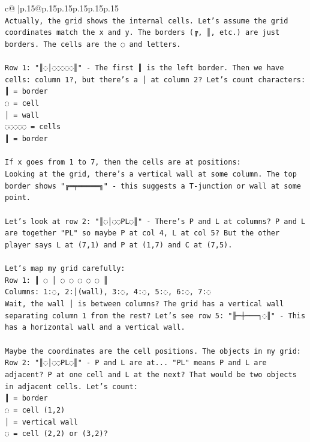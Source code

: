 \documentclass{article}
\begin{document}
{\begin{supertabular}{c@{$\;$}|p{.15\linewidth}@{}p{.15\linewidth}p{.15\linewidth}p{.15\linewidth}p{.15\linewidth}p{.15\linewidth}}
{{{\\ 
\texttt{Actually, the grid shows the internal cells. Let's assume the grid coordinates match the x and y. The borders (╔, ║, etc.) are just borders. The cells are the ◌ and letters.} \\
\\ 
\texttt{Row 1: "║◌│◌◌◌◌◌║" {-} The first ║ is the left border. Then we have cells: column 1?, but there's a │ at column 2? Let's count characters:} \\
\texttt{║ = border} \\
\texttt{◌ = cell} \\
\texttt{│ = wall} \\
\texttt{◌◌◌◌◌ = cells} \\
\texttt{║ = border} \\
\\ 
\texttt{If x goes from 1 to 7, then the cells are at positions:} \\
\texttt{Looking at the grid, there's a vertical wall at some column. The top border shows "╔═╤═════╗" {-} this suggests a T{-}junction or wall at some point.} \\
\\ 
\texttt{Let's look at row 2: "║◌│◌◌PL◌║" {-} There's P and L at columns? P and L are together "PL" so maybe P at col 4, L at col 5? But the other player says L at (7,1) and P at (1,7) and C at (7,5).} \\
\\ 
\texttt{Let's map my grid carefully:} \\
\texttt{Row 1: ║ ◌ │ ◌ ◌ ◌ ◌ ◌ ║} \\
\texttt{Columns: 1:◌, 2:│(wall), 3:◌, 4:◌, 5:◌, 6:◌, 7:◌} \\
\texttt{Wait, the wall │ is between columns? The grid has a vertical wall separating column 1 from the rest? Let's see row 5: "╟─┼───┐◌║" {-} This has a horizontal wall and a vertical wall.} \\
\\ 
\texttt{Maybe the coordinates are the cell positions. The objects in my grid:} \\
\texttt{Row 2: "║◌│◌◌PL◌║" {-} P and L are at... "PL" means P and L are adjacent? P at one cell and L at the next? That would be two objects in adjacent cells. Let's count:} \\
\texttt{║ = border} \\
\texttt{◌ = cell (1,2)} \\
\texttt{│ = vertical wall} \\
\texttt{◌ = cell (2,2) or (3,2)?} \\
}}}
\end{supertabular}}
\end{document}
